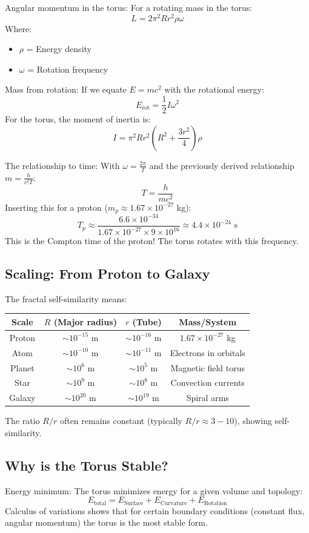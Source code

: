 Angular momentum in the torus:
For a rotating mass in the torus:
\[
L = 2\pi^2 R r^2 \rho \omega
\]
Where:
\begin{itemize}
	\item \( \rho \) = Energy density
	\item \( \omega \) = Rotation frequency
\end{itemize}

Mass from rotation:
If we equate \( E = mc^2 \) with the rotational energy:
\[
E_{\text{rot}} = \frac{1}{2} I \omega^2
\]
For the torus, the moment of inertia is:
\[
I = \pi^2 R r^2 \left(R^2 + \frac{3r^2}{4}\right) \rho
\]

The relationship to time:
With \( \omega = \frac{2\pi}{T} \) and the previously derived relationship \( m = \frac{h}{c^2 T} \):
\[
T = \frac{h}{mc^2}
\]
Inserting this for a proton (\( m_p \approx 1.67 \times 10^{-27} \) kg):
\[
T_p \approx \frac{6.6 \times 10^{-34}}{1.67 \times 10^{-27} \times 9 \times 10^{16}} \approx 4.4 \times 10^{-24} \text{ s}
\]
This is the Compton time of the proton! The torus rotates with this frequency.

\subsection{Scaling: From Proton to Galaxy}
The fractal self-similarity means:
\begin{table}[H]
	\centering
	\begin{tabular}{|c|c|c|c|}
		\hline
		Scale & \( R \) (Major radius) & \( r \) (Tube) & Mass/System \\
		\hline
		Proton & \( \sim 10^{-15} \) m & \( \sim 10^{-16} \) m & \( 1.67 \times 10^{-27} \) kg \\
		Atom & \( \sim 10^{-10} \) m & \( \sim 10^{-11} \) m & Electrons in orbitals \\
		Planet & \( \sim 10^{6} \) m & \( \sim 10^{5} \) m & Magnetic field torus \\
		Star & \( \sim 10^{9} \) m & \( \sim 10^{8} \) m & Convection currents \\
		Galaxy & \( \sim 10^{20} \) m & \( \sim 10^{19} \) m & Spiral arms \\
		\hline
	\end{tabular}
\end{table}
The ratio \( R/r \) often remains constant (typically \( R/r \approx 3-10 \)), showing self-similarity.

\subsection{Why is the Torus Stable?}
Energy minimum:
The torus minimizes energy for a given volume and topology:
\[
E_{\text{total}} = E_{\text{Surface}} + E_{\text{Curvature}} + E_{\text{Rotation}}
\]
Calculus of variations shows that for certain boundary conditions (constant flux, angular momentum) the torus is the most stable form.

